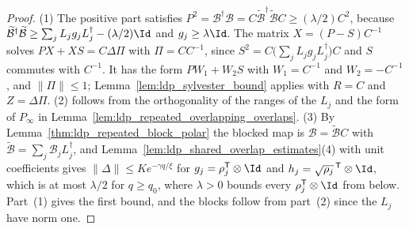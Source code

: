 \begin{proof}
    \leanok
    (1) The positive part satisfies $P^2=\mathcal B^\dagger\mathcal B
        =C\widetilde{\mathcal B}^\dagger\widetilde{\mathcal B}C\geq(\lambda/2)C^2$, because
    $\widetilde{\mathcal B}^\dagger\widetilde{\mathcal B}\geq\sum_jL_jg_jL_j^\dagger
        -(\lambda/2)\Id$ and $g_j\geq\lambda\Id$. The matrix $X=(P-S)C^{-1}$ solves
    $PX+XS=C\Delta\Pi$ with $\Pi=CC^{-1}$, since $S^2=C\bigl(\sum_jL_jg_jL_j^\dagger\bigr)C$
    and $S$ commutes with $C^{-1}$. It has the form $PW_1+W_2S$ with $W_1=C^{-1}$ and
    $W_2=-C^{-1}$, and $\lVert\Pi\rVert\leq1$; Lemma~\ref{lem:ldp_sylvester_bound}
    applies with $R=C$ and $Z=\Delta\Pi$. (2) follows from the orthogonality of the ranges of the $L_j$ and
    the form of $P_\infty$ in Lemma~\ref{lem:ldp_repeated_overlapping_overlaps}. (3) By
    Lemma~\ref{thm:ldp_repeated_block_polar} the blocked map is
    $\mathcal B=\widetilde{\mathcal B}C$ with $\widetilde{\mathcal B}=\sum_j\mathcal B_jL_j^\dagger$,
    and Lemma~\ref{lem:ldp_shared_overlap_estimates}(4) with unit coefficients gives
    $\lVert\Delta\rVert\leq Ke^{-\gamma q/\xi}$ for
    $g_j=\rho_j^{\mathsf T}\otimes\Id$ and $h_j=\sqrt{\rho_j}^{\,\mathsf T}\otimes\Id$, which
    is at most $\lambda/2$ for $q\geq q_0$, where $\lambda>0$ bounds every
    $\rho_j^{\mathsf T}\otimes\Id$ from below. Part~(1) gives the first bound, and the
    blocks follow from part~(2) since the $L_j$ have norm one.
\end{proof}

